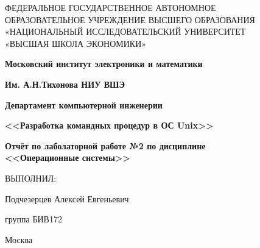 \begin{titlepage}
	\begin{center}
		ФЕДЕРАЛЬНОЕ  ГОСУДАРСТВЕННОЕ АВТОНОМНОЕ \\
		ОБРАЗОВАТЕЛЬНОЕ УЧРЕЖДЕНИЕ ВЫСШЕГО ОБРАЗОВАНИЯ\\
		«НАЦИОНАЛЬНЫЙ ИССЛЕДОВАТЕЛЬСКИЙ УНИВЕРСИТЕТ\\
		«ВЫСШАЯ ШКОЛА ЭКОНОМИКИ»
	\end{center}
	
	\begin{center}
		\textbf{Московский институт электроники и математики}
		
		\textbf{Им. А.Н.Тихонова НИУ ВШЭ}
		
		\textbf{Департамент компьютерной инженерии}
	\end{center}	
	\vspace{5ex}
	\begin{center}
\textbf{<<Разработка командных процедур в ОС Unix>>}
	\end{center}	
	\vspace{1ex}
	\begin{center}
\textbf{Отчёт по лаболаторной работе №2 по дисциплине \\
	<<Операционные системы>>}
	\end{center}	
	\vspace{5ex}
	
	\begin{multicols}{2}
	\vfill\null
	\columnbreak
	ВЫПОЛНИЛ:
	
	Подчезерцев Алексей Евгеньевич
	
	группа БИВ172
	\end{multicols}

	\vfill
	\begin{center}
		Москва \the\year
	\end{center}
\end{titlepage}